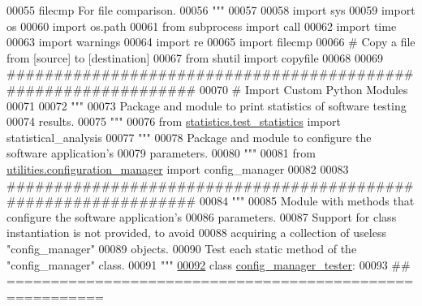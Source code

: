 \begin{DoxyCode}
00055 \textcolor{stringliteral}{    filecmp     For file comparison.}
00056 \textcolor{stringliteral}{"""}
00057 
00058 \textcolor{keyword}{import} sys
00059 \textcolor{keyword}{import} os
00060 \textcolor{keyword}{import} os.path
00061 \textcolor{keyword}{from} subprocess \textcolor{keyword}{import} call
00062 \textcolor{keyword}{import} time
00063 \textcolor{keyword}{import} warnings
00064 \textcolor{keyword}{import} re
00065 \textcolor{keyword}{import} filecmp
00066 \textcolor{comment}{# Copy a file from [source] to [destination]}
00067 \textcolor{keyword}{from} shutil \textcolor{keyword}{import} copyfile
00068 
00069 \textcolor{comment}{###############################################################}
00070 \textcolor{comment}{#   Import Custom Python Modules}
00071 
00072 \textcolor{stringliteral}{"""}
00073 \textcolor{stringliteral}{    Package and module to print statistics of software testing}
00074 \textcolor{stringliteral}{        results.}
00075 \textcolor{stringliteral}{"""}
00076 \textcolor{keyword}{from} \hyperlink{namespacestatistics_1_1test__statistics}{statistics.test\_statistics} \textcolor{keyword}{import} statistical\_analysis
00077 \textcolor{stringliteral}{"""}
00078 \textcolor{stringliteral}{    Package and module to configure the software application's}
00079 \textcolor{stringliteral}{        parameters.}
00080 \textcolor{stringliteral}{"""}
00081 \textcolor{keyword}{from} \hyperlink{namespaceutilities_1_1configuration__manager}{utilities.configuration\_manager} \textcolor{keyword}{import} config\_manager
00082 
00083 \textcolor{comment}{###############################################################}
00084 \textcolor{stringliteral}{"""}
00085 \textcolor{stringliteral}{    Module with methods that configure the software application's}
00086 \textcolor{stringliteral}{        parameters.}
00087 \textcolor{stringliteral}{    Support for class instantiation is not provided, to avoid}
00088 \textcolor{stringliteral}{        acquiring a collection of useless "config\_manager"}
00089 \textcolor{stringliteral}{        objects.}
00090 \textcolor{stringliteral}{    Test each static method of the "config\_manager" class.}
00091 \textcolor{stringliteral}{"""}
\hypertarget{configuration__manager__tester_8py_source_l00092}{}\hyperlink{classutilities_1_1configuration__manager__tester_1_1config__manager__tester}{00092} \textcolor{keyword}{class }\hyperlink{classutilities_1_1configuration__manager__tester_1_1config__manager__tester}{config\_manager\_tester}:
00093     \textcolor{comment}{## =========================================================}

\end{DoxyCode}
